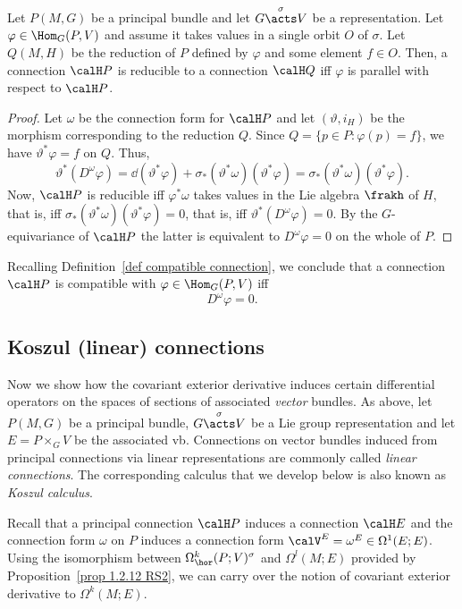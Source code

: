 \begin{prop}[{{\cite[Prop.~1.6.10]{RS2}}}]\label{prop 1.6.10 RS2}
    Let $P(M,G)$ be a principal bundle and let $G\overset{\sigma}{\acts}V$ be a representation. Let $\varphi\in\Hom_G(P,V)$ and assume it takes values in a single orbit $O$ of $\sigma$. Let $Q(M,H)$ be the reduction of $P$ defined by $\varphi$ and some element $f\in O$. Then, a connection $\calH P$ is reducible to a connection $\calH Q$ iff $\varphi$ is parallel with respect to $\calH P$.
\end{prop}
\begin{proof}
    Let $\omega$ be the connection form for $\calH P$ and let $(\vartheta,i_H)$ be the morphism corresponding to the reduction $Q$. Since $Q=\{p\in P:\varphi(p)=f\}$, we have $\vartheta^\ast \varphi=f$ on $Q$. Thus,
    \[\vartheta^\ast(D^\omega\varphi)=\dd (\vartheta^\ast \varphi)+\sigma_\ast(\vartheta^\ast\omega)(\vartheta^\ast\varphi)=\sigma_\ast(\vartheta^\ast\omega)(\vartheta^\ast\varphi).\]
    Now, $\calH P$ is reducible iff $\varphi^\ast\omega$ takes values in the Lie algebra $\frakh$ of $H$, that is, iff $\sigma_\ast(\vartheta^\ast\omega)(\vartheta^\ast\varphi)=0$, that is, iff $\vartheta^\ast(D^\omega\varphi)=0$. By the $G$-equivariance of $\calH P$ the latter is equivalent to $D^\omega \varphi=0$ on the whole of $P$.
\end{proof}

Recalling Definition~\ref{def compatible connection}, we conclude that a connection $\calH P$ is compatible with $\varphi\in\Hom_G(P,V)$ iff
\[D^\omega\varphi=0.\]




\subsection{Koszul (linear) connections}

Now we show how the covariant exterior derivative induces certain differential operators on the spaces of sections of associated \emph{vector} bundles. As above, let $P(M,G)$ be a principal bundle, $G\overset{\sigma}{\acts}V$ be a Lie group representation and let $E=P\times_G V$ be the associated \gls{vb}. Connections on vector bundles induced from principal connections via linear representations are commonly called \emph{linear connections}. The corresponding calculus that we develop below is also known as \emph{Koszul calculus}.

Recall that a principal connection $\calH P$ induces a connection $\calH E$ and the connection form $\omega$ on $P$ induces a connection form $\calV^E=\omega^E\in \Omega^1(E;E)$. Using the isomorphism between $\Omega^k_{\hor}(P;V)^\sigma$ and $\Omega^l(M;E)$ provided by Proposition~\ref{prop 1.2.12 RS2}, we can carry over the notion of covariant exterior derivative to $\Omega^k(M;E)$.

